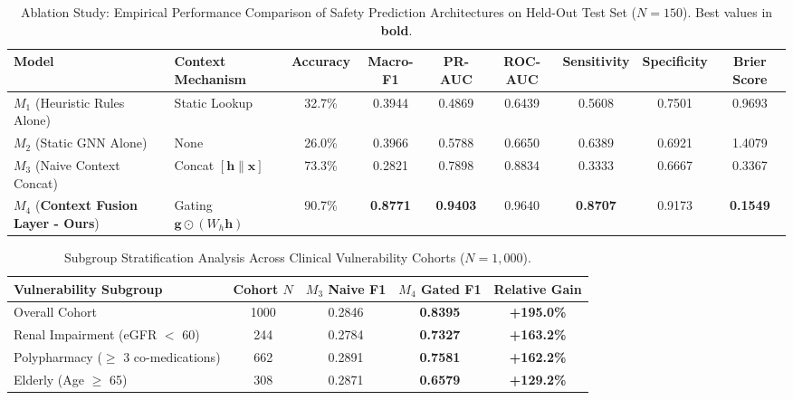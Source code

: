 
\begin{table}[t]
\centering
\small
\caption{Ablation Study: Empirical Performance Comparison of Safety Prediction Architectures on Held-Out Test Set ($N = 150$). Best values in \textbf{bold}.}
\label{tab:ablation_primary_results}
\begin{tabular}{llccccccc}
\toprule
\textbf{Model} & \textbf{Context Mechanism} & \textbf{Accuracy} & \textbf{Macro-F1} & \textbf{PR-AUC} & \textbf{ROC-AUC} & \textbf{Sensitivity} & \textbf{Specificity} & \textbf{Brier Score} \\
\midrule
$M_1$ (Heuristic Rules Alone) & Static Lookup & 32.7\% & 0.3944 & 0.4869 & 0.6439 & 0.5608 & 0.7501 & 0.9693 \\
$M_2$ (Static GNN Alone) & None & 26.0\% & 0.3966 & 0.5788 & 0.6650 & 0.6389 & 0.6921 & 1.4079 \\
$M_3$ (Naive Context Concat) & Concat $[\mathbf{h} \parallel \mathbf{x}]$ & 73.3\% & 0.2821 & 0.7898 & 0.8834 & 0.3333 & 0.6667 & 0.3367 \\
$M_4$ (\textbf{Context Fusion Layer - Ours}) & Gating $\mathbf{g} \odot (W_h \mathbf{h})$ & 90.7\% & \textbf{0.8771} & \textbf{0.9403} & 0.9640 & \textbf{0.8707} & 0.9173 & \textbf{0.1549} \\
\bottomrule
\end{tabular}
\end{table}



\begin{table}[h]
\centering
\small
\caption{Subgroup Stratification Analysis Across Clinical Vulnerability Cohorts ($N = 1,000$).}
\label{tab:subgroup_stratification}
\begin{tabular}{lcccc}
\toprule
\textbf{Vulnerability Subgroup} & \textbf{Cohort $N$} & \textbf{$M_3$ Naive F1} & \textbf{$M_4$ Gated F1} & \textbf{Relative Gain} \\
\midrule
Overall Cohort & 1000 & 0.2846 & \textbf{0.8395} & \textbf{+195.0\%} \\
Renal Impairment (eGFR $<$ 60) & 244 & 0.2784 & \textbf{0.7327} & \textbf{+163.2\%} \\
Polypharmacy ($\ge$ 3 co-medications) & 662 & 0.2891 & \textbf{0.7581} & \textbf{+162.2\%} \\
Elderly (Age $\ge$ 65) & 308 & 0.2871 & \textbf{0.6579} & \textbf{+129.2\%} \\
\bottomrule
\end{tabular}
\end{table}